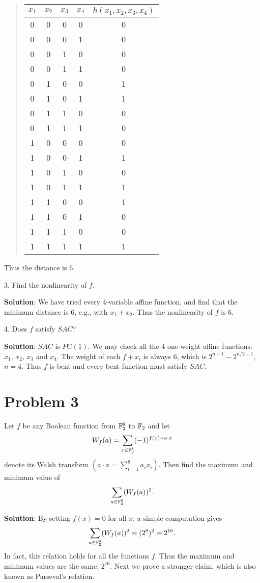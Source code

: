\documentclass[12pt]{article}
\theoremstyle{plain}
\begin{document}
\begin{quote}
\begin{tabular}{c c c c| c }
$x_1$ & $x_2$ & $x_3$ & $x_4$ & $h(x_1, x_2, x_3, x_4)$ \\
\hline
0 & 0 & 0 & 0 & 0 \\
0 & 0 & 0 & 1 & 0 \\
0 & 0 & 1 & 0 & 0 \\
0 & 0 & 1 & 1 & 0 \\
0 & 1 & 0 & 0 & 1 \\
0 & 1 & 0 & 1 & 1 \\
0 & 1 & 1 & 0 & 0 \\
0 & 1 & 1 & 1 & 0 \\
1 & 0 & 0 & 0 & 0 \\
1 & 0 & 0 & 1 & 1 \\
1 & 0 & 1 & 0 & 0 \\
1 & 0 & 1 & 1 & 1 \\
1 & 1 & 0 & 0 & 1 \\
1 & 1 & 0 & 1 & 0 \\
1 & 1 & 1 & 0 & 0 \\
1 & 1 & 1 & 1 & 1 \\
\end{tabular}
\end{quote}
Thus the distance is 6.

3. Find the nonlinearity of $f$.

{\bf Solution}: We have tried every 4-variable affine function, and find that the minimum distance is 6, e.g., with $x_1 + x_2$. Thus the nonlinearity of $f$ is 6.

4. Does $f$ satisfy $SAC$?

{\bf Solution}: $SAC$ is $PC(1)$. We may check all the 4 one-weight affine functions: $x_1$, $x_2$, $x_3$ and $x_4$. The weight of each $f+x_i$ is always 6, which is $2^{n-1} - 2^{n/2-1}$, $n=4$. Thus $f$ is bent and every bent function must satisfy $SAC$.


\section{Problem 3}
Let $f$ be any Boolean function from $\mathbb{F}_2^8$ to $\mathbb{F}_2$ and let 
$$W_f(a) = \sum_{x\in \mathbb{F}_2^8} (-1)^{f(x)+a\cdot x}$$
denote its Walsh transform $(a\cdot x = \sum_{i=1}^8 a_i x_i)$. Then find the maximum and minimum value of
$$\sum_{a \in \mathbb{F}_2^8}(W_f(a))^2.$$

{\bf Solution}: By setting $f(x)=0$ for all $x$, a simple computation gives 
$$\sum_{a \in \mathbb{F}_2^8}(W_f(a))^2 = (2^8)^2 = 2^{16}.$$
In fact, this relation holds for all the functions $f$. Thus the maximum and minimum values are the same: $2^{16}$. 
Next we prove a stronger claim, which is also known as Parseval's relation.
\end{document}
